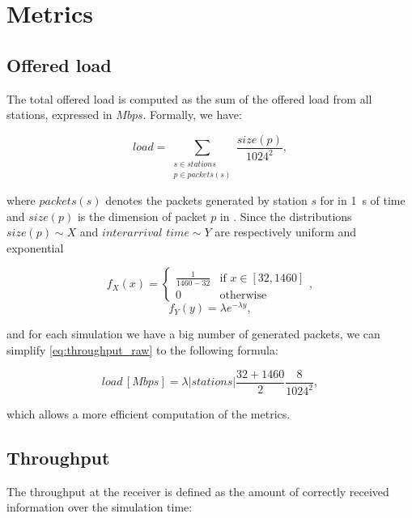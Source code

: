 \section{Metrics}
\label{sec:metrics}

\subsection{Offered load}
The total offered load is computed as the sum of the offered load from all stations, expressed in $Mbps$.
Formally, we have:

\begin{equation}
    load = \sum_{\substack{s \in stations \\ p \in packets(s)}} \frac{size(p)}{1024 ^ 2},
    \label{eq:throughput_raw}
\end{equation}

where $packets(s)$ denotes the packets generated by station $s$ for in \SI{1}{\second} of time and $size(p)$ is the dimension of packet $p$ in \si{\byte}.
Since the distributions $size(p) \sim X$ and $interarrival \,\, time \sim Y$ are respectively uniform and exponential

\begin{equation*}
    f_X(x) =
    \begin{cases}
        \frac{1}{1460-32} & \text{if $x \in [32, 1460]$}\\[0.3em]
        0 & \text{otherwise}
    \end{cases},
\end{equation*}
\begin{equation*}
    f_Y(y) = \lambda e^{-\lambda y},
\end{equation*}

and for each simulation we have a big number of generated packets, we can simplify \cref{eq:throughput_raw} to the following formula:

\begin{equation*}
    load \, [\si{Mbps}] = \lambda |stations| \frac{32+1460}{2} \frac{8}{1024 ^ 2},
\end{equation*}

which allows a more efficient computation of the metrics.


\subsection{Throughput}
The throughput at the receiver is defined as the amount of correctly received information over the simulation time:

